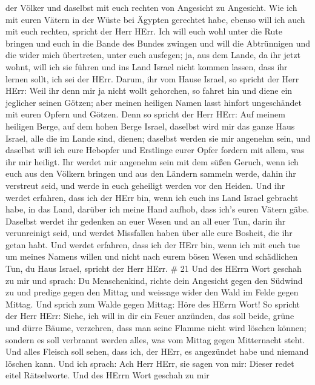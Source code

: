 der Völker und daselbst mit euch rechten von Angesicht zu Angesicht.
 Wie ich mit euren Vätern in der Wüste bei Ägypten
gerechtet habe, ebenso will ich auch mit euch rechten, spricht der Herr
HErr.  Ich will euch wohl unter die Rute bringen und euch
in die Bande des Bundes zwingen  und will die Abtrünnigen
und die wider mich übertreten, unter euch ausfegen; ja, aus dem Lande,
da ihr jetzt wohnt, will ich sie führen und ins Land Israel nicht kommen
lassen, dass ihr lernen sollt, ich sei der HErr.  Darum,
ihr vom Hause Israel, so spricht der Herr HErr: Weil ihr denn mir ja
nicht wollt gehorchen, so fahret hin und diene ein jeglicher seinen
Götzen; aber meinen heiligen Namen lasst hinfort ungeschändet mit euren
Opfern und Götzen.  Denn so spricht der Herr HErr: Auf
meinem heiligen Berge, auf dem hohen Berge Israel, daselbst wird mir das
ganze Haus Israel, alle die im Lande sind, dienen; daselbst werden sie
mir angenehm sein, und daselbst will ich eure Hebopfer und Erstlinge
eurer Opfer fordern mit allem, was ihr mir heiligt.  Ihr
werdet mir angenehm sein mit dem süßen Geruch, wenn ich euch aus den
Völkern bringen und aus den Ländern sammeln werde, dahin ihr verstreut
seid, und werde in euch geheiligt werden vor den Heiden. 
Und ihr werdet erfahren, dass ich der HErr bin, wenn ich euch ins Land
Israel gebracht habe, in das Land, darüber ich meine Hand aufhob, dass
ich's euren Vätern gäbe.  Daselbst werdet ihr gedenken an
euer Wesen und an all euer Tun, darin ihr verunreinigt seid, und werdet
Missfallen haben über alle eure Bosheit, die ihr getan habt.
 Und werdet erfahren, dass ich der HErr bin, wenn ich mit
euch tue um meines Namens willen und nicht nach eurem bösen Wesen und
schädlichen Tun, du Haus Israel, spricht der Herr HErr. \# 21
 Und des HErrn Wort geschah zu mir und sprach: 
Du Menschenkind, richte dein Angesicht gegen den Südwind zu und predige
gegen den Mittag und weissage wider den Wald im Felde gegen Mittag.
 Und sprich zum Walde gegen Mittag: Höre des HErrn Wort! So
spricht der Herr HErr: Siehe, ich will in dir ein Feuer anzünden, das
soll beide, grüne und dürre Bäume, verzehren, dass man seine Flamme
nicht wird löschen können; sondern es soll verbrannt werden alles, was
vom Mittag gegen Mitternacht steht.  Und alles Fleisch soll
sehen, dass ich, der HErr, es angezündet habe und niemand löschen kann.
 Und ich sprach: Ach Herr HErr, sie sagen von mir: Dieser
redet eitel Rätselworte.  Und des HErrn Wort geschah zu mir
